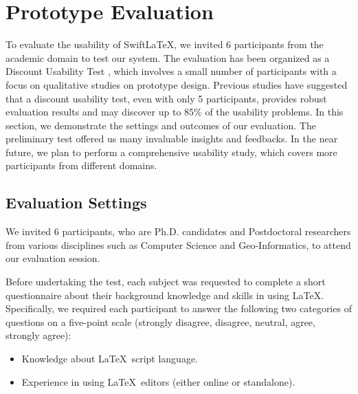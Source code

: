 \documentclass[sigconf]{acmart}
\newcommand{\todo}[1]{\textbf{\{TODO: #1\}}}
\begin{document}




\section{Prototype Evaluation}\label{sect:eve}
To evaluate the usability of SwiftLaTeX, we invited 6 participants from the academic domain to test our system. 
The evaluation has been organized as a Discount Usability Test \cite{nielsen1989usability}, which involves a small number of participants with a focus on qualitative studies on prototype design. Previous studies \cite{nielsen2015you}\cite{nielsen2009discount} have suggested that a discount usability test, even with only 5 participants, provides robust evaluation results and may discover up to 85\% of the 
usability problems. In this section, we demonstrate the settings and outcomes of our evaluation. 
The preliminary test offered us many invaluable insights and feedbacks.
In the near future, we plan to perform a comprehensive usability study, which covers more participants from different domains.

\subsection{Evaluation Settings}
We invited 6 participants, who are Ph.D. candidates and Postdoctoral researchers from various disciplines such as Computer Science and Geo-Informatics, to attend our evaluation session.

Before undertaking the test, each subject was requested to complete a short questionnaire about their background knowledge and skills in using \LaTeX. Specifically, we required each participant to answer the following two categories of questions on a five-point scale (strongly disagree, disagree, neutral, agree, strongly agree):
\begin{itemize}
\item Knowledge about \LaTeX\ script language.
\item Experience in using \LaTeX\ editors (either online or standalone).
\end{itemize}
\end{document}
